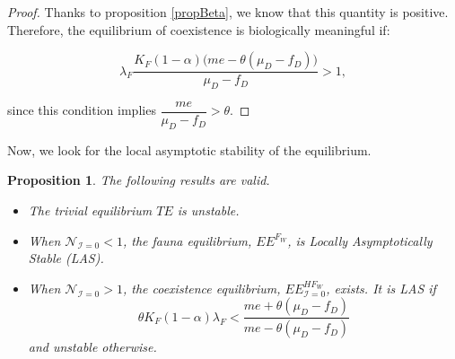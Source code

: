 \documentclass{article}
\newcommand{\lfw}{\lambda_{F}}
\newcommand{\lfw}{\lambda_{F}}
\newcommand{\cI}{\mathcal{I}}
\newtheorem{prop}{Proposition}
\begin{document}
\begin{proof}
Thanks to proposition \ref{propBeta}, we know that this quantity is positive. Therefore, the equilibrium of coexistence is biologically meaningful if:

\begin{equation*}
\lfw \dfrac{ K_F(1-\alpha) \big(me - \theta (\mu_D - f_D) \big)}{\mu_D - f_D}> 1,
\end{equation*}

since this condition implies $\dfrac{me}{\mu_D - f_D} > \theta$.

\end{proof}


Now, we look for the local asymptotic stability of the equilibrium.

\begin{prop}\label{propLAS, I=0} The following results are valid.
\begin{itemize}
\item The trivial equilibrium $TE$ is unstable.
\item When $\mathcal{N}_{\cI = 0} < 1$, the fauna equilibrium, $EE^{F_W}$, is Locally Asymptotically Stable (LAS).
\item When $\mathcal{N}_{\cI = 0} > 1$, the coexistence equilibrium, $EE^{HF_W}_{\cI =0}$, exists. It is LAS if 
$$\theta K_{F}(1-\alpha)\lambda_{F}<\dfrac{me+\theta(\mu_{D}-f_{D})}{me-\theta(\mu_{D}-f_{D})}$$
and unstable otherwise.
\end{itemize}
\end{prop}
\end{document}
